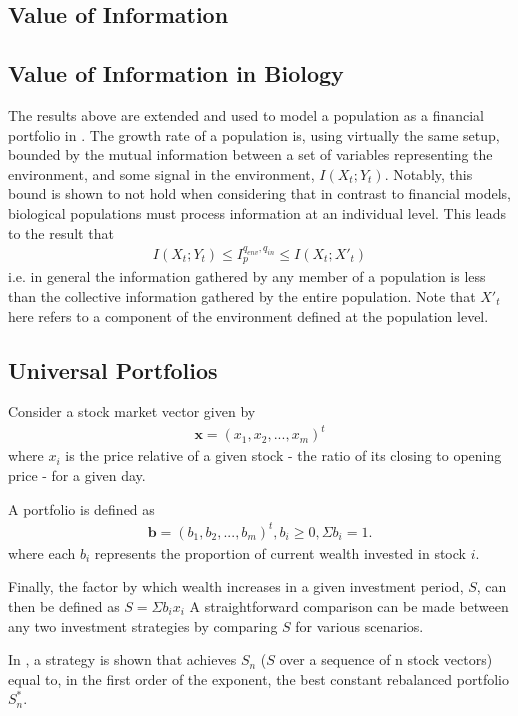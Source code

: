 \documentclass[10pt, twocolumn]{IEEEtran}
\begin{document}
\subsection{Value of Information}

\subsection{Value of Information in Biology}
The results above are extended and used to model a population as a financial portfolio in \cite{Rivoire2011}.
The growth rate of a population is, using virtually the same setup, bounded by the mutual information between
a set of variables representing the environment, and some signal in the environment,  $I(X_{t};Y_{t})$.
Notably, this bound is shown to not hold when considering that in contrast to financial models, biological populations
must process information at an individual level. This leads to the result that
\begin{gather*}
  I(X_{t};Y_{t}) \le I_{p}^{q_{env},q_{in}} \le I(X_{t};X'_{t})
\end{gather*}
i.e. in general the information gathered by any member of a population is less than the collective information
gathered by the entire population. Note that $X'_{t}$ here refers to a component of the environment defined at the population level.
\subsection{Universal Portfolios}
Consider a stock market vector given by
\begin{gather*}
  \boldsymbol{x} = (x_{1}, x_{2}, ..., x_{m})^{t}
\end{gather*}
where $x_{i}$ is the price relative of a given stock - the ratio of its closing to opening price - for a given day.

A portfolio is defined as
\begin{gather*}
  \boldsymbol{b} = (b_{1}, b_{2}, ..., b_{m})^{t}, b_{i} \ge 0, \Sigma b_{i} = 1.
\end{gather*}
where each $b_{i}$ represents the proportion of current wealth invested in stock $i$.

Finally, the factor by which wealth increases
in a given investment period, $S$, can then be defined as $ S = \Sigma b_{i}x_{i} $
A straightforward comparison can be made between any two investment strategies by comparing $S$ for various scenarios.

In \cite{universal}, a strategy is shown that achieves $S_{n}$ ($S$ over a sequence of n stock vectors) equal to,%
in the first order of the exponent, the best constant rebalanced portfolio $S^{*}_{n}$. 
\end{document}
